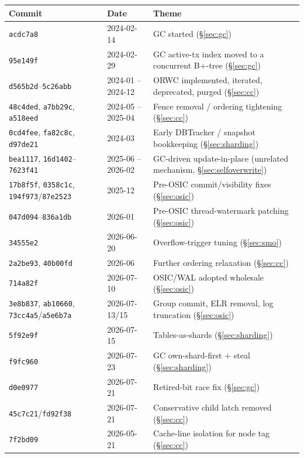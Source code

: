 \documentclass[11pt]{article}
\newcommand{\commit}[1]{\texttt{#1}}
\begin{document}
\begin{longtable}{@{}p{2.1cm}p{1.8cm}p{9.5cm}@{}}
\toprule
\textbf{Commit} & \textbf{Date} & \textbf{Theme} \\
\midrule
\endhead
\commit{acdc7a8} & 2024-02-14 & GC started (\S\ref{sec:gc}) \\
\commit{95e149f} & 2024-02-29 & GC active-tx index moved to a concurrent B+-tree (\S\ref{sec:gc}) \\
\commit{d565b2d}--\commit{5c26abb} & 2024-01 -- 2024-12 & ORWC implemented, iterated, deprecated, purged (\S\ref{sec:cc}) \\
\commit{48c4ded}, \commit{a7bb29c}, \commit{a518eed} & 2024-05 -- 2025-04 & Fence removal / ordering tightening (\S\ref{sec:cc}) \\
\commit{0cd4fee}, \commit{fa82c8c}, \commit{d97de21} & 2024-03 & Early DBTracker / snapshot bookkeeping (\S\ref{sec:sharding}) \\
\commit{bea1117}, \commit{16d1402}--\commit{7623f41} & 2025-06 -- 2026-02 & GC-driven update-in-place (unrelated mechanism, \S\ref{sec:selfoverwrite}) \\
\commit{17b8f5f}, \commit{0358c1c}, \commit{194f973}/\commit{87e2523} & 2025-12 & Pre-OSIC commit/visibility fixes (\S\ref{sec:osic}) \\
\commit{047d094}--\commit{836a1db} & 2026-01 & Pre-OSIC thread-watermark patching (\S\ref{sec:osic}) \\
\commit{34555e2} & 2026-06-20 & Overflow-trigger tuning (\S\ref{sec:smo}) \\
\commit{2a2be93}, \commit{40b00fd} & 2026-06 & Further ordering relaxation (\S\ref{sec:cc}) \\
\commit{714a82f} & 2026-07-10 & OSIC/WAL adopted wholesale (\S\ref{sec:osic}) \\
\commit{3e8b837}, \commit{ab10660}, \commit{73cc4a5}/\commit{a5e6b7a} & 2026-07-13/15 & Group commit, ELR removal, log truncation (\S\ref{sec:osic}) \\
\commit{5f92e9f} & 2026-07-15 & Tables-as-shards (\S\ref{sec:sharding}) \\
\commit{f9fc960} & 2026-07-23 & GC own-shard-first + steal (\S\ref{sec:sharding}) \\
\commit{d0e0977} & 2026-07-21 & Retired-bit race fix (\S\ref{sec:gc}) \\
\commit{45c7c21}/\commit{fd92f38} & 2026-07-21 & Conservative child latch removed (\S\ref{sec:cc}) \\
\commit{7f2bd09} & 2026-05-21 & Cache-line isolation for node tag (\S\ref{sec:cc}) \\

\end{longtable}
\end{document}
